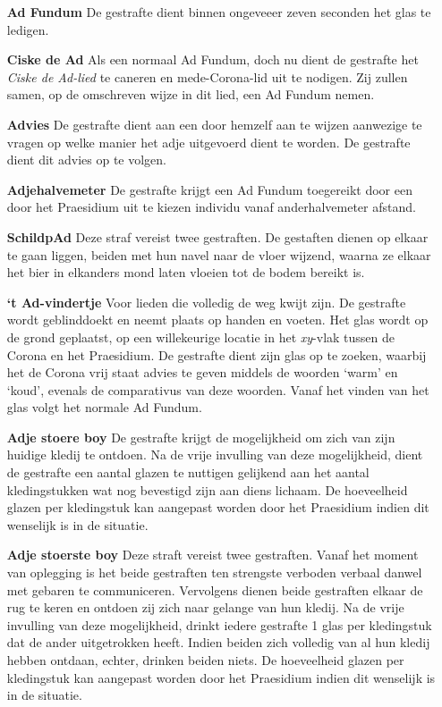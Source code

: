 \begin{itemize}
    \item[\textbf{Ad Fundum}] De gestrafte dient binnen ongeveeer zeven seconden het glas te ledigen.
    
    \item[\textbf{Ciske de Ad}] Als een normaal Ad Fundum, doch nu dient de gestrafte het \textit{Ciske de Ad-lied} te caneren en mede-Corona-lid uit te nodigen. Zij zullen samen, op de omschreven wijze in dit lied, een Ad Fundum nemen.
    
    \item[\textbf{Advies}] De gestrafte dient aan een door hemzelf aan te wijzen aanwezige te vragen op welke manier het adje uitgevoerd dient te worden. De gestrafte dient dit advies op te volgen.

    \item[\textbf{Adjehalvemeter}] De gestrafte krijgt een Ad Fundum toegereikt door een door het Praesidium uit te kiezen individu vanaf anderhalvemeter afstand.
    
    \item[\textbf{SchildpAd}] Deze straf vereist twee gestraften. De gestaften dienen op elkaar te gaan liggen, beiden met hun navel naar de vloer wijzend, waarna ze elkaar het bier in elkanders mond laten vloeien tot de bodem bereikt is.
    
    \item[\textbf{‘t Ad-vindertje}] Voor lieden die volledig de weg kwijt zijn. De gestrafte wordt geblinddoekt en neemt plaats op handen en voeten. Het glas wordt op de grond geplaatst, op een willekeurige locatie in het \textit{xy}-vlak tussen de Corona en het Praesidium. De gestrafte dient zijn glas op te zoeken, waarbij het de Corona vrij staat advies te geven middels de woorden ‘warm’ en ‘koud’, evenals de comparativus van deze woorden. Vanaf het vinden van het glas volgt het normale Ad Fundum.
    
    \item[\textbf{Adje stoere boy}] De gestrafte krijgt de mogelijkheid om zich van zijn huidige kledij te ontdoen. Na de vrije invulling van deze mogelijkheid, dient de gestrafte een aantal glazen te nuttigen gelijkend aan het aantal kledingstukken wat nog bevestigd zijn aan diens lichaam. De hoeveelheid glazen per kledingstuk kan aangepast worden door het Praesidium indien dit wenselijk is in de situatie. 
    
    \item[\textbf{Adje stoerste boy}] Deze straft vereist twee gestraften. Vanaf het moment van oplegging is het beide gestraften ten strengste verboden verbaal danwel met gebaren te communiceren. Vervolgens dienen beide gestraften elkaar de rug te keren en ontdoen zij zich naar gelange van hun kledij. Na de vrije invulling van deze mogelijkheid, drinkt iedere gestrafte 1 glas per kledingstuk dat de ander uitgetrokken heeft. Indien beiden zich volledig van al hun kledij hebben ontdaan, echter, drinken beiden niets. De hoeveelheid glazen per kledingstuk kan aangepast worden door het Praesidium indien dit wenselijk is in de situatie. 


\end{itemize}
